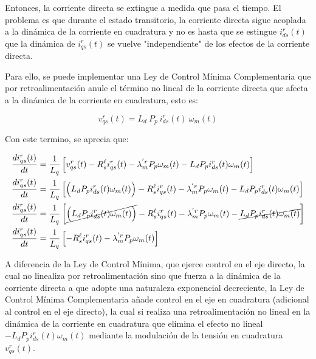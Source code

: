 \documentclass[blue,fullpaper]{ludusofficial}  %
\begin{document}
\begin{enumerate}
    Entonces, la corriente directa se extingue a medida que pasa el tiempo. El problema es que durante el estado transitorio, la corriente directa sigue acoplada a la dinámica de la corriente en cuadratura y no es hasta que se estingue $i_{ds}^{r}(t)$ que la dinámica de $i_{qs}^{r}(t)$ se vuelve "independiente" de los efectos de la corriente directa.

    Para ello, se puede implementar una Ley de Control Mínima Complementaria que por retroalimentación anule el término no lineal de la corriente directa que afecta a la dinámica de la corriente en cuadratura, esto es:

    \begin{equation}
\label{eq:ley-complementaria}
        v_{qs}^{r}(t) =   L_{d} \ P_{p} \ i_{ds}^{r}(t) \ \omega_{m}(t)
    \end{equation}

    Con este termino, se aprecia que:

    \begin{align*}
        \frac{di_{qs}^{r}(t)}{dt}  & = \frac{1}{L_{q} } \left[ v_{qs}^{r}(t) - R_{s}^{\ell} i_{qs}^{r}(t) - \lambda_{m}^{'r} P_{p}  \omega_{m}(t) -  L_{d} P_{p} i_{ds}^{r}(t) \omega_{m}(t)  \right]
        \\
        \frac{di_{qs}^{r}(t)}{dt}  & = \frac{1}{L_{q} } \left[ \Big( L_{d} P_{p} i_{ds}^{r}(t) \omega_{m}(t) \Big) - R_{s}^{\ell} i_{qs}^{r}(t) - \lambda_{m}^{'r} P_{p}  \omega_{m}(t) -  L_{d} P_{p} i_{ds}^{r}(t) \omega_{m}(t)  \right]
        \\
        \frac{di_{qs}^{r}(t)}{dt}  & = \frac{1}{L_{q} } \left[ \cancel{ \Big( L_{d} P_{p} i_{ds}^{r}(t) \omega_{m}(t) \Big) } - R_{s}^{\ell} i_{qs}^{r}(t) - \lambda_{m}^{'r} P_{p}  \omega_{m}(t) - \cancel{  L_{d} P_{p} i_{ds}^{r}(t) \omega_{m}(t) }  \right]\\
        \frac{di_{qs}^{r}(t)}{dt}  & = \frac{1}{L_{q} } \left[ - R_{s}^{\ell} i_{qs}^{r}(t) - \lambda_{m}^{'r} P_{p}  \omega_{m}(t)  \right]
    \end{align*}

    A diferencia de la Ley de Control Mínima, que ejerce control en el eje directo, la cual no linealiza por retroalimentación sino que fuerza a la dinámica de la corriente directa a que adopte una naturaleza exponencial decreciente, la Ley de Control Mínima Complementaria añade control en el eje en cuadratura (adicional al control en el eje directo), la cual si realiza una retroalimentación no lineal en la dinámica de la corriente en cuadratura que elimina el efecto no lineal $-L_{d} P_{p} i_{ds}^{r}(t) \omega_{m}(t) $ mediante la modulación de la tensión en cuadratura $ v_{qs}^{r}(t)$.


\end{enumerate}
\end{document}

